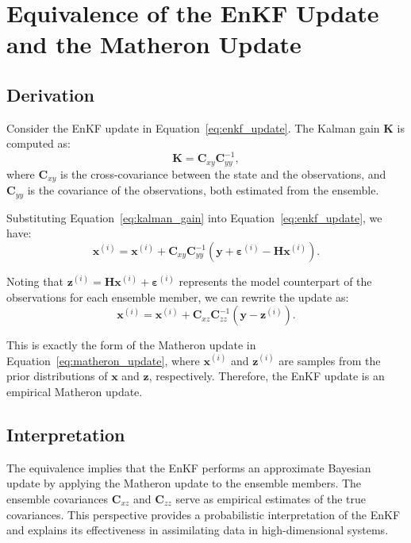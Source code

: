 \documentclass{article}
\theoremstyle{plain}
\begin{document}
\section{Equivalence of the EnKF Update and the Matheron Update}

\subsection{Derivation}

Consider the EnKF update in Equation~\eqref{eq:enkf_update}. The Kalman gain $\mathbf{K}$ is computed as:
\begin{equation}
    \mathbf{K} = \mathbf{C}_{xy} \mathbf{C}_{yy}^{-1},
    \label{eq:kalman_gain}
\end{equation}
where $\mathbf{C}_{xy}$ is the cross-covariance between the state and the observations, and $\mathbf{C}_{yy}$ is the covariance of the observations, both estimated from the ensemble.

Substituting Equation~\eqref{eq:kalman_gain} into Equation~\eqref{eq:enkf_update}, we have:
\begin{equation}
    \mathbf{x}^{(i)} = \mathbf{x}^{(i)} + \mathbf{C}_{xy} \mathbf{C}_{yy}^{-1} \left( \mathbf{y} + \boldsymbol{\varepsilon}^{(i)} - \mathbf{H} \mathbf{x}^{(i)} \right).
\end{equation}

Noting that $\mathbf{z}^{(i)} = \mathbf{H} \mathbf{x}^{(i)} + \boldsymbol{\varepsilon}^{(i)}$ represents the model counterpart of the observations for each ensemble member, we can rewrite the update as:
\begin{equation}
    \mathbf{x}^{(i)} = \mathbf{x}^{(i)} + \mathbf{C}_{xz} \mathbf{C}_{zz}^{-1} \left( \mathbf{y} - \mathbf{z}^{(i)} \right).
    \label{eq:enkf_matheron}
\end{equation}

This is exactly the form of the Matheron update in Equation~\eqref{eq:matheron_update}, where $\mathbf{x}^{(i)}$ and $\mathbf{z}^{(i)}$ are samples from the prior distributions of $\mathbf{x}$ and $\mathbf{z}$, respectively. Therefore, the EnKF update is an empirical Matheron update.

\subsection{Interpretation}

The equivalence implies that the EnKF performs an approximate Bayesian update by applying the Matheron update to the ensemble members. The ensemble covariances $\mathbf{C}_{xz}$ and $\mathbf{C}_{zz}$ serve as empirical estimates of the true covariances. This perspective provides a probabilistic interpretation of the EnKF and explains its effectiveness in assimilating data in high-dimensional systems.
\end{document}
